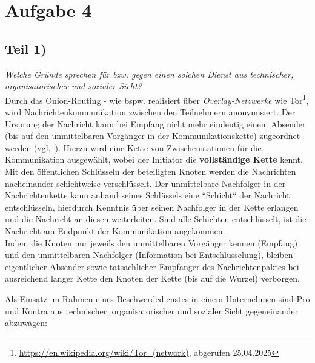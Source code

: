 \chapter{Aufgabe 4}

\section{Teil 1)}

\textit{Welche Gründe sprechen für bzw. gegen einen solchen Dienst aus technischer,
    organisatorischer und sozialer Sicht?}\\


\noindent
Durch das Onion-Routing - wie bspw. realisiert über \textit{Overlay-Netzwerke} wie Tor\footnote{
\url{https://en.wikipedia.org/wiki/Tor_(network)}, abgerufen 25.04.2025
}, wird Nachrichtenkommunikation zwischen den Teilnehmern anonymisiert.
Der Ursprung der Nachricht kann bei Empfang nicht mehr eindeutig einem Absender (bis auf den unmittelbaren Vorgänger in der Kommunikationskette) zugeordnet werden (vgl.~\cite[57]{ITS6}).
Hierzu wird eine Kette von Zwischenstationen für die Kommunikation ausgewählt, wobei der Initiator die \textbf{vollständige Kette} kennt. \\
Mit den öffentlichen Schlüsseln der beteiligten Knoten werden die Nachrichten nacheinander schichtweise verschlüsselt.
Der unmittelbare Nachfolger in der Nachrichtenkette kann anhand seines Schlüssels eine ``Schicht`` der Nachricht entschlüsseln, hierdurch Kenntnis über seinen Nachfolger in der Kette erlangen und die Nachricht an diesen weiterleiten.
Sind alle Schichten entschlüsselt, ist die Nachricht am Endpunkt der Kommunikation angekommen.\\
Indem die Knoten nur jeweils den unmittelbaren Vorgänger kennen (Empfang) und den unmittelbaren Nachfolger (Information bei Entschlüsselung), bleiben eigentlicher Absender sowie tatsächlicher Empfänger des Nachrichtenpaktes bei ausreichend langer Kette den Knoten der Kette (bis auf die Wurzel) verborgen.

\noindent
Als Einsatz im Rahmen eines Beschwerdedienstes in einem Unternehmen sind Pro und Kontra aus technischer, organisatorischer und sozialer Sicht gegeneinander abzuwägen:

